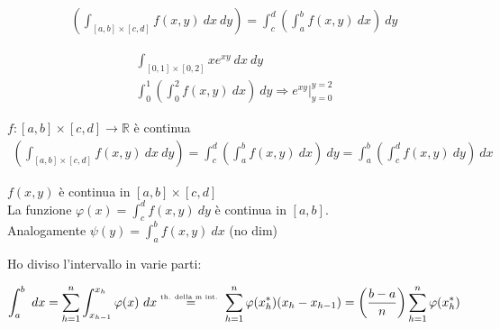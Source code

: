 \documentclass[a4paper, oneside]{article}
\newcommand{\tab}{\hspace*{2em}}
\begin{document}
\begin{gather*}
    \left( \int_{[a,b] \times [c,d]} f(x,y) \ dx\ dy \right) = \int_{c}^{d} \left( \int_{a}^{b} f(x,y) \ dx\right) \ dy  
\end{gather*}
\begin{example}
    \begin{gather*}
        \int_{[0,1] \times [0,2]} x e^{xy} \ dx \ dy\\
        \int_{0}^{1} \left( \int_{0}^{2} f(x,y) \ dx \right) \ dy \Rightarrow e^{xy} |_{y=0}^{y=2}  
    \end{gather*}
\end{example}
\begin{theorem}
     $f:[a,b] \times [c,d] \to \mathbb{R}$ è continua\\
    \begin{gather*}
        \left( \int_{[a,b] \times [c,d]} f(x,y) \ dx \ dy\right) = \int_{c}^{d} \left( \int_a^b f(x,y) \ dx \right) \ dy = \int_{a}^{b} \left(\int_{c}^{d} f(x,y) \ dy\right) \ dx       
    \end{gather*}
\end{theorem}
\begin{lemma}
     $f(x,y)$ è continua in $[a,b] \times [c,d]$\\
    La funzione $\varphi(x) = \int_{c}^{d} f(x,y) \ dy $ è continua in $[a,b]$.\\
    Analogamente $\psi(y) = \int_{a}^{b} f(x,y) \ dx$ \tab\tab \tiny (no dim)\normalsize\\
\end{lemma}
Ho diviso l'intervallo in varie parti:
\begin{center}
    \tiny
    \normalsize
\end{center}
\begin{gather*}
    \int_{a}^{b} \ dx = \sum_{h=1}^{n} \int_{x_{h-1}}^{x_h} \varphi(x) \ dx \overset{\text{\tiny th. della m int. \normalsize}}{=} \sum_{h=1}^{n} \varphi(x_h^*) (x_h - x_{h-1}) = \left(\frac{b-a}{n}\right) \sum_{h=1}^{n} \varphi(x_h^*)\\
\end{gather*}
\end{document}
